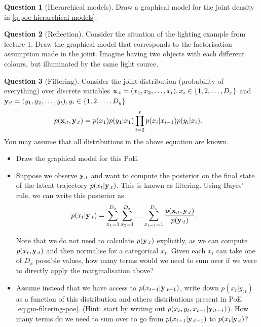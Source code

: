 \documentclass[a4paper]{article}
\theoremstyle{definition}
\newtheorem{question}{Question}
\begin{document}
\begin{question}[Hierarchical models]
\label{q:gm-hierarchical-models}
Draw a graphical model for the joint density in \cref{q:poe-hierarchical-models}.
\end{question}

\begin{question}[Reflection]
\label{q:gm-reflection}
Consider the situation of the lighting example from lecture 1. Draw the graphical model that corresponds to the factorisation assumption made in the joint. Imagine having two objects with each different colours, but illuminated by the same light source.
\end{question}


\begin{question}[Filtering]
\label{q:gm-filtering}
Consider the joint distribution (probability of everything) over discrete variables $\mathbf{x}_{:t}=(x_1,x_2,\ldots,x_t), x_i\in\{1,2,\ldots,D_x\}$ and $\mathbf{y}_{:t}=(y_1,y_2,\ldots,y_t), y_i\in\{1,2,\ldots,D_y\}$
\begin{align}
p( \mathbf{x}_{:t}, \mathbf{y}_{:t} ) &= p( x_1 ) p( y_1 | x_1 ) \prod_{i=2}^t p( x_i | x_{i-1}) p( y_i | x_i ). \label{eq:gm-filtering-poe}
\end{align}
You may assume that all distributions in the above equation are known. 

\begin{itemize}
\item Draw the graphical model for this PoE.
\item Suppose we observe $\mathbf{y}_{:t}$ and want to compute the posterior on the final state of the latent trajectory $p( x_t | \mathbf{y}_{:t} )$. This is known as filtering. Using Bayes' rule, we can write this posterior as
\begin{align}
p( x_t | \mathbf{y}_{:t} ) &= \sum_{x_1=1}^{D_x} \sum_{x_2=1}^{D_x} \ldots \sum_{x_{t-1}=1}^{D_x} \frac{ p( \mathbf{x}_{:t}, \mathbf{y}_{:t} ) }{ p( \mathbf{y}_{:t} ) }. \label{eq:graphical-models-naive-filter}
\end{align} 

Note that we do not need to calculate $p( \mathbf{y}_{:t} )$ explicitly, as we can compute $p( x_t, \mathbf{y}_{:t} )$ and then normalise for a categorical $x_t$. Given each $x_i$ can take one of $D_x$ possible values, how many terms would we need to sum over if we were to directly apply the marginalisation above?

\item Assume instead that we have access to $p( x_{t-1} | \mathbf{y}_{:t-1} )$, write down $p(x_t | y_{:t})$ as a function of this distribution and others distributions present in PoE \eqref{eq:gm-filtering-poe}. (Hint: start by writing out $p(x_t, y_t, x_{t-1} | \mathbf{y}_{:t-1})$). How many terms do we need to sum over to go from $p( x_{t-1} | \mathbf{y}_{:t-1} )$ to $p( x_{t} | \mathbf{y}_{:t} )$?


\end{itemize}
\end{question}
\end{document}

